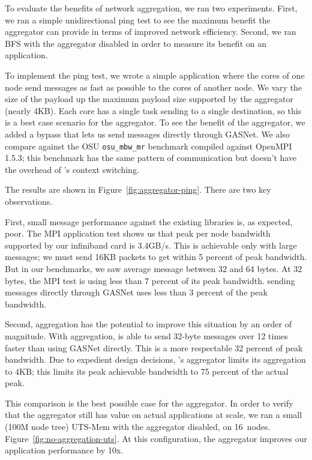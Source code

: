 {To evaluate the benefits of network aggregation, we ran two experiments.
First, we ran a simple unidirectional ping test to see the maximum
benefit the aggregator can provide in terms of improved network
efficiency. Second, we ran BFS with the aggregator disabled in order to
measure its benefit on an application.

To implement the ping test, we wrote a simple \Grappa application where
the cores of one node send messages as fast as possible to the cores
of another node. We vary the size of the payload up the maximum
payload size supported by the aggregator (nearly 4KB). Each core has a
single task sending to a single destination, so this is a best case
scenario for the aggregator. To see the benefit of the aggregator, we
added a bypass that lets us send messages directly through GASNet. We
also compare against the OSU \texttt{osu\_mbw\_mr} benchmark
\cite{osu:mpi}  compiled against OpenMPI 1.5.3; this
benchmark has the same pattern of communication but doesn't have the
overhead of \Grappa's context switching.

The results are shown in Figure~\ref{fig:aggregator-ping}. There are
two key observations.

First, small message performance against the existing libraries is, as expected, poor. The MPI application test shows us that peak per node
bandwidth supported by our infiniband card is 3.4GB/s. This is
achievable only with large messages; we must send 16KB packets to get
within 5 percent of peak bandwidth. But in our benchmarks, we saw
average message between 32 and 64 bytes. At 32 bytes, the MPI test is
using less than 7 percent of its peak bandwidth. \Grappa sending
messages directly through GASNet uses less than 3 percent of the peak
bandwidth.

Second, aggregation has the potential to improve this situation by an
order of magnitude. With aggregation, \Grappa is able to send 32-byte
messages over 12 times faster than using GASNet directly. This is a
more respectable 32 percent of peak bandwidth. Due to expedient design
decisions, \Grappa's aggregator limits its aggregation to 4KB; this
limits its peak achievable bandwidth to 75 percent of the actual
peak.

This comparison is the best possible case for the aggregator. In
order to verify that the aggregator still has value on actual
applications at scale, we ran a small (100M node tree) UTS-Mem
with the aggregator disabled, on 16~nodes.
Figure~\ref{fig:no-aggregation-uts}. At this configuration, the aggregator
improves our application performance by 10x. 

}
